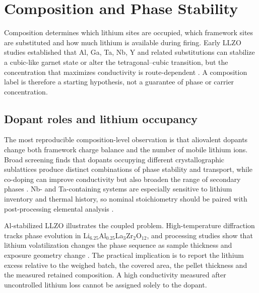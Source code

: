 \section{Composition and Phase Stability}
\label{sec:composition}

Composition determines which lithium sites are occupied, which framework sites are substituted and how much lithium is available during firing. Early LLZO studies established that Al, Ga, Ta, Nb, Y and related substitutions can stabilize a cubic-like garnet state or alter the tetragonal--cubic transition, but the concentration that maximizes conductivity is route-dependent \cite{puente2021garnet,raju2021crystal,anderson2024comprehensive,aote2023enhancement,siddiqui2024increased}. A composition label is therefore a starting hypothesis, not a guarantee of phase or carrier concentration.

\subsection{Dopant roles and lithium occupancy}

The most reproducible composition-level observation is that aliovalent dopants change both framework charge balance and the number of mobile lithium ions. Broad screening finds that dopants occupying different crystallographic sublattices produce distinct combinations of phase stability and transport, while co-doping can improve conductivity but also broaden the range of secondary phases \cite{anderson2024comprehensive,aote2024effect,aote2024investigation,aote2023enhancement,xu2023co}. Nb- and Ta-containing systems are especially sensitive to lithium inventory and thermal history, so nominal stoichiometry should be paired with post-processing elemental analysis \cite{luo2025phase,siddiqui2024increased,moy2025irreversible}.

Al-stabilized LLZO illustrates the coupled problem. High-temperature diffraction tracks phase evolution in Li$_{6.25}$Al$_{0.25}$La$_3$Zr$_2$O$_{12}$, and processing studies show that lithium volatilization changes the phase sequence as sample thickness and exposure geometry change \cite{gullbrekken2025phase,montoya2024lithium,heywood2023tailoring}. The practical implication is to report the lithium excess relative to the weighed batch, the covered area, the pellet thickness and the measured retained composition. A high conductivity measured after uncontrolled lithium loss cannot be assigned solely to the dopant.


